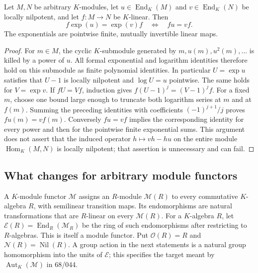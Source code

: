 \begin{theorem}\label{C-intertwine}
Let $M,N$ be arbitrary $K$-modules, let $u\in\operatorname{End}_K(M)$ and
$v\in\operatorname{End}_K(N)$ be locally nilpotent, and let $f:M\to N$ be
$K$-linear. Then
\[
 f\exp(u)=\exp(v)f\quad\Longleftrightarrow\quad fu=vf.
\]
The exponentials are pointwise finite, mutually invertible linear maps.
\end{theorem}
\begin{proof}
For $m\in M$, the cyclic $K$-submodule generated by
$m,u(m),u^2(m),\ldots$ is killed by a power of $u$.
All formal exponential and logarithm identities therefore hold on this
submodule as finite polynomial identities. In particular
$U=\exp u$ satisfies that $U-1$ is locally nilpotent and
$\log U=u$ pointwise. The same holds for $V=\exp v$.
If $fU=Vf$, induction gives $f(U-1)^j=(V-1)^jf$. For a fixed $m$, choose
one bound large enough to truncate both logarithm series at $m$ and at
$f(m)$. Summing the preceding identities with coefficients
$(-1)^{j+1}/j$ proves $fu(m)=vf(m)$. Conversely $fu=vf$ implies the
corresponding identity for every power and then for the pointwise finite
exponential sums. This argument does not assert that the induced operator
$h\mapsto vh-hu$ on the entire module $\operatorname{Hom}_K(M,N)$ is
locally nilpotent; that assertion is unnecessary and can fail.
\end{proof}

\subsection{What changes for arbitrary module functors}
A $K$-module functor $\mathcal M$ assigns an $R$-module $\mathcal M(R)$ to
every commutative $K$-algebra $R$, with semilinear transition maps. Its
endomorphisms are natural transformations that are $R$-linear on every
$\mathcal M(R)$. For a $K$-algebra $R$, let
$\mathscr E(R)=\operatorname{End}_{R}(\mathcal M_R)$ be the ring of such
endomorphisms after restricting to $R$-algebras. This is itself a module
functor. Put $\mathcal O(R)=R$ and $\mathcal N(R)=\operatorname{Nil}(R)$.
A group action in the next statements is a natural group homomorphism
into the units of $\mathscr E$; this specifies the target meant by
$\operatorname{Aut}_K(\mathcal M)$ in 68/044.

